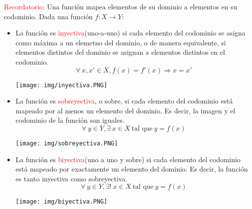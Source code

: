 \documentclass[../main]{subfiles}
\begin{document}
\textcolor{red}{Recordatorio:} Una función mapea elementos de su dominio a elementos en su codominio. Dada una función $f: X\rightarrow Y$:
\begin{itemize}
    \item 
    \begin{minipage}{0.5\textwidth}
        La función es \textcolor{red}{inyectiva}(uno-a-uno) si cada elemento del codominio se asigna como máxima a un elemetno del dominio, o de manera equivalente, si elementos distintos del dominio se asignan a elementos distintos en el codominio.
        \begin{equation}
            \forall \ x,x' \in X, f(x)=f'(x) \Rightarrow x=x'
        \end{equation}    
    \end{minipage}
    \begin{minipage}{0.5\textwidth}
        \begin{center}
            \texttt{[image: img/inyectiva.PNG]}
        \end{center}
    \end{minipage}
    \item 
    \begin{minipage}{0.5\textwidth}
        La función es \textcolor{red}{sobreyectiva}, o sobre, si cada elemento del codominio está mapeado por al menos un elemento del dominio. Es decir, la imagen y el codominio de la función son iguales.
        \begin{equation}
            \forall \ y \in Y, \exists \ x \in X \ \text{tal que} \ y=f(x)
        \end{equation}   
    \end{minipage}
    \begin{minipage}{0.5\textwidth}
        \begin{center}
            \texttt{[image: img/sobreyectiva.PNG]}
        \end{center}
    \end{minipage}
    \item 
    \begin{minipage}{0.5\textwidth}
        La función es \textcolor{red}{biyectiva}(uno a uno y sobre) si cada elemento del codominio está mapeado por exactamente un elemento del dominio. Es decir, la función es tanto inyectiva como sobreyectiva.
        \begin{equation}
            \forall \ y\in Y, \exists ! \ x\in X \ \text{tal que} \ y=f(x)
        \end{equation}  
    \end{minipage}
    \begin{minipage}{0.5\textwidth}
        \begin{center}
            \texttt{[image: img/biyectiva.PNG]}
        \end{center}
    \end{minipage}
\end{itemize}
\end{document}
